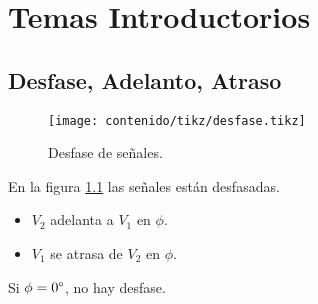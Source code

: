 %
%
%

\chapter{Temas Introductorios}

\section{Desfase, Adelanto, Atraso}
  \begin{figure}[H]
    \centering
    \texttt{[image: contenido/tikz/desfase.tikz]}
    \caption{Desfase de señales.}
    \label{img_desfase}
  \end{figure}
  En la figura \ref{img_desfase} las señales están desfasadas.
  \begin{itemize}
    \item $V_2$ adelanta a $V_1$ en $\phi$.
    \item $V_1$ se atrasa de $V_2$ en $\phi$.
  \end{itemize}
  Si $\phi=0\degree$, no hay desfase.

